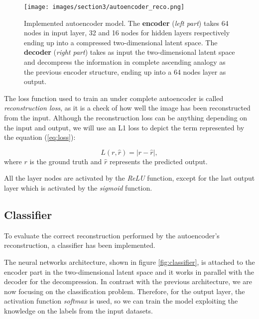 \documentclass{article}
\begin{document}
\begin{figure}[H]
  \centering
  \texttt{[image: images/section3/autoencoder\_reco.png]}
  \caption{Implemented autoencoder model. The \textbf{encoder} (\textit{left part}) takes 64 nodes in input layer, 32 and 16 nodes for
  hidden layers respectively ending up into a compressed two-dimensional latent space. 
  The \textbf{decoder} (\textit{right part}) takes as input the two-dimensional latent space and decompress the information 
  in complete ascending analogy as the previous encoder structure, ending up into a 64 nodes layer as output.}
  \label{fig:ae}
  \end{figure}

\par The loss function used to train an under complete autoencoder is called \textit{reconstruction loss},
as it is a check of how well the image has been reconstructed from the input.
Although the reconstruction loss can be anything depending on the input and output,
we will use an L1 loss to depict the term represented by the equation (\ref{eq:loss}):

\begin{equation}
  L ( r, \hat{r} ) = | r - \hat{r} |,
  \label{eq:loss} 
\end{equation}
where $r$ is the ground truth and $\hat{r}$ represents the predicted output.

\par All the layer nodes are activated by the \textit{ReLU} function, 
except for the last output layer which is activated by the \textit{sigmoid} function. 



\subsection{Classifier}

To evaluate the correct reconstruction performed by the autoencoder's reconstruction, a classifier has been implemented.
\par The neural networks architecture, shown in figure \ref{fig:classifier}, is attached to the encoder part in the two-dimensional
latent space and it works in parallel with the decoder for the decompression. 
In contrast with the previous architecture, we are now focusing on the classification problem. 
Therefore, for the output layer, the activation function \textit{softmax} is used, so we can train the model exploiting 
the knowledge on the labels from the input datasets.
\end{document}
